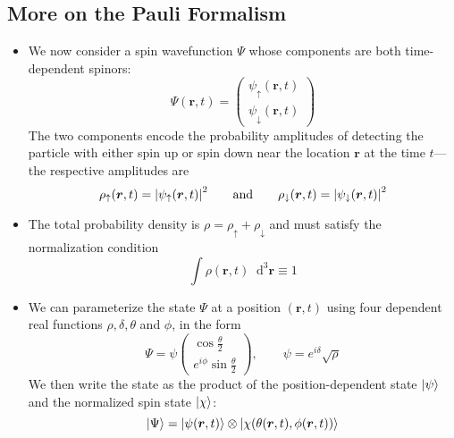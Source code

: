 \documentclass[11pt, a4paper]{article}
\newcommand{\diff}{\mathop{}\!\mathrm{d}} %
\newcommand{\dr}{\diff^{3} \r}  %
\newcommand{\eqtext}[1]{\qquad \text{#1} \qquad}
\renewcommand{\vec}[1]{\bm{#1}}  %
\newcommand{\ua}{\uparrow}  %
\newcommand{\da}{\downarrow}  %
\renewcommand{\r}{\vec{r}}  %
\newcommand{\p}{\psi}  %
\renewcommand{\P}{\Psi}  %
\begin{document}
\subsection{More on the Pauli Formalism}
\begin{itemize}
	\item  We now consider a spin wavefunction $ \P $ whose components are both time-dependent spinors:
	\begin{equation*}
		\P(\r, t) = 
		\begin{pmatrix}
			\p_{\ua}(\r, t)\\
			\p_{\da}(\r, t)
		\end{pmatrix}
	\end{equation*}
	The two components encode the probability amplitudes of detecting the particle with either spin up or spin down near the location $ \vec{r} $ at the time $ t $---the respective amplitudes are
	\begin{equation*}
		\rho_{\ua}(\r, t) = \abs{\p_{\ua}(\r, t)}^{2} \eqtext{and} \rho_{\da}(\r, t) = \abs{\p_{\da}(\r, t)}^{2}
	\end{equation*}
	
	\item The total probability density is $ \rho = \rho_{\ua} + \rho_{\da} $ and must satisfy the normalization condition
	\begin{equation*}
		\int \rho(\r, t)\dr \equiv 1
	\end{equation*}
	
	\item We can parameterize the state $ \P $ at a position $ (\r, t) $ using four dependent real functions $ \rho, \delta, \theta $ and $ \phi $, in the form
	\begin{equation*}
		\P = \p
		\begin{pmatrix}
			\cos \frac{\theta}{2}\\
			e^{i\phi}\sin \frac{\theta}{2}
		\end{pmatrix},
		\qquad
		\p = e^{i\delta}\sqrt{\rho}
	\end{equation*}
	We then write the state as the product of the position-dependent state $ \ket{\p} $ and the normalized spin state $ \ket{\chi} $:
	\begin{equation*}
		\ket{\P} = \ket{\p(\r, t)} \otimes \ket{\chi(\theta(\r, t), \phi(\r, t))}
	\end{equation*}
	

\end{itemize}
\end{document}
